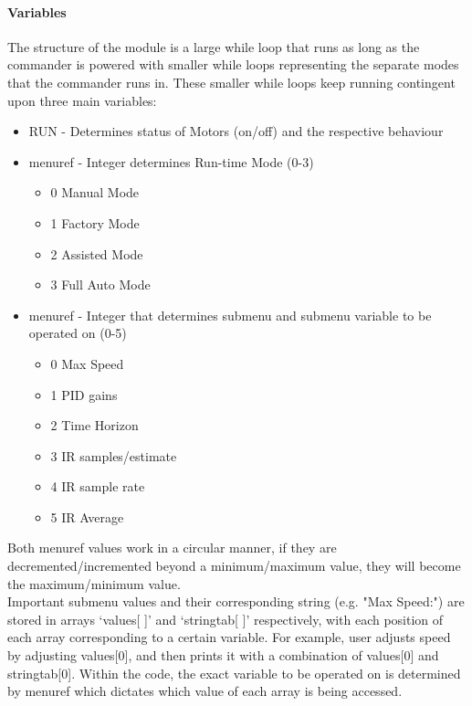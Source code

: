 \documentclass[MTRX3700report.tex]{subfiles}
\begin{document}
	\paragraph{Variables} The structure of the module is a large while loop that runs as long as the commander is powered with smaller while loops representing the separate modes that the commander runs in. These smaller while loops keep running contingent upon three main variables:
	\begin{itemize}
		\item RUN - Determines status of Motors (on/off) and the respective behaviour
		\item menu\textunderscore ref - Integer determines Run-time Mode (0-3)
		\begin{itemize}
			\item 0  Manual Mode
			\item 1  Factory Mode
			\item 2  Assisted Mode
			\item 3  Full Auto Mode
		\end{itemize}
		\item menu\textunderscore ref - Integer that determines submenu and submenu variable to be operated on (0-5)
		\begin{itemize}
			\item 0  Max Speed
			\item 1  PID gains
			\item 2  Time Horizon
			\item 3  IR samples/estimate
			\item 4	 IR sample rate	
			\item 5  IR Average
		\end{itemize}
	\end{itemize}
	
	Both menu\textunderscore ref values work in a circular manner, if they are decremented/incremented beyond a minimum/maximum value, they will become the maximum/minimum value.\\
	Important submenu values and their corresponding string (e.g. "Max Speed:") are stored in arrays `values[ ]' and `stringtab[ ]' respectively, with each position of each array corresponding to a certain variable. For example, user adjusts speed by adjusting values[0], and then prints it with a combination of values[0] and stringtab[0]. Within the code, the exact variable to be operated on is determined by menu\textunderscore ref which dictates which value of each array is being accessed.\\
	
\end{document}
